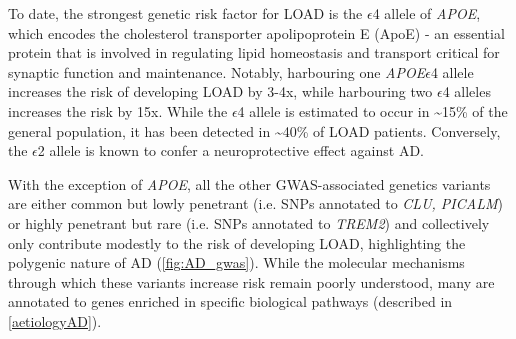 To date, the strongest genetic risk factor for LOAD is the $\epsilon$4 allele of \textit{APOE}\cite{Lambert2013}, which encodes the cholesterol transporter apolipoprotein E (ApoE) - an essential protein that is involved in regulating lipid homeostasis and transport critical for synaptic function and maintenance\cite{DH2001}. Notably, harbouring one \textit{APOE}$\epsilon$4 allele increases the risk of developing LOAD by 3-4x, while harbouring two $\epsilon$4 alleles increases the risk by 15x\cite{Farrer1997}. While the $\epsilon$4 allele is estimated to occur in \textasciitilde 15\% of the general population, it has been detected in \textasciitilde40\% of LOAD patients\cite{Farrer1997}. Conversely, the $\epsilon$2 allele is known to confer a neuroprotective effect against AD\cite{Nagy1995,EH1994}. 

With the exception of \textit{APOE}, all the other GWAS-associated genetics variants are either common but lowly penetrant (i.e. SNPs annotated to \textit{CLU, PICALM}) or highly penetrant but rare (i.e. SNPs annotated to \textit{TREM2}) and collectively only contribute modestly to the risk of developing LOAD, highlighting the polygenic nature of AD (\cref{fig:AD_gwas}). While the molecular mechanisms through which these variants increase risk remain poorly understood, many are annotated to genes enriched in specific biological pathways (described in \cref{aetiologyAD}). 


